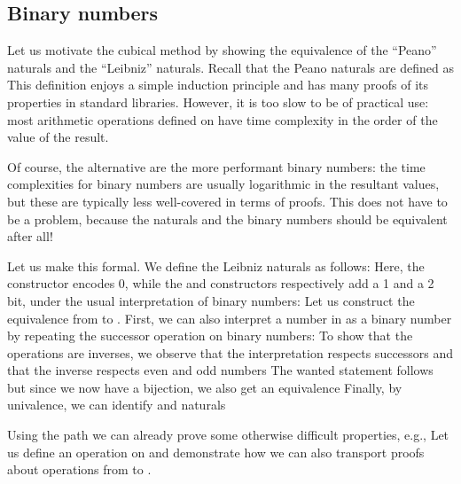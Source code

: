 \documentclass[Main.tex]{subfiles}
\begin{document}
\subsection{Binary numbers}\label{ssec:binary}
Let us motivate the cubical method by showing the equivalence of the ``Peano'' naturals and the ``Leibniz'' naturals. Recall that the Peano naturals are defined as 
This definition enjoys a simple induction principle and has many proofs of its properties in standard libraries. However, it is too slow to be of practical use: most arithmetic operations defined on \bN{} have time complexity in the order of the value of the result.

Of course, the alternative are the more performant binary numbers: the time complexities for binary numbers are usually logarithmic in the resultant values, but these are typically less well-covered in terms of proofs. This does not have to be a problem, because the \bN{} naturals and the binary numbers should be equivalent after all!

Let us make this formal. We define the Leibniz naturals as follows:
Here, the  constructor encodes 0, while the  and  constructors respectively add a 1 and a 2 bit, under the usual interpretation of binary numbers:
Let us construct the equivalence from \bN{} to \bL{}. First, we can also interpret a number in \bN{} as a binary number by repeating the successor operation on binary numbers:
To show that the operations are inverses, we observe that the interpretation respects successors
and that the inverse respects even and odd numbers
The wanted statement follows
but since we now have a bijection, we also get an equivalence
Finally, by univalence, we can identify \bN{} and \bL{} naturals

Using the path  we can already prove some otherwise difficult properties, e.g.,
Let us define an operation on \bL{} and demonstrate how we can also transport proofs about operations from \bN{} to \bL{}. 
\end{document}
